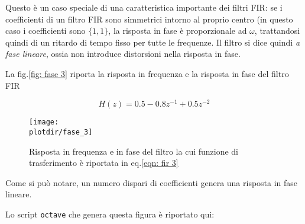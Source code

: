 Questo \`e un caso speciale di una caratteristica importante dei filtri FIR:
se i coefficienti di un filtro FIR sono simmetrici intorno al proprio centro
(in questo caso i coefficienti sono $\{ 1, 1 \}$, la risposta in fase \`e
proporzionale ad $\omega$, trattandosi quindi di un ritardo di tempo fisso per
tutte le frequenze. Il filtro si dice quindi \emph{a fase lineare}, ossia non
introduce distorsioni nella risposta in fase.

La fig.\vref{fig: fase 3} riporta la risposta in frequenza e la risposta in
fase del filtro FIR

\begin{equation}\label{eqn: fir 3}
	H ( z ) = 0.5 - 0.8 z^{-1} + 0.5 z^{-2}
\end{equation}
\begin{figure}[htb]
	\begin{center}
	\texttt{[image: \\plotdir/fase\_3]}
	\caption{Risposta in frequenza e in fase del filtro la cui funzione di
	trasferimento \`e riportata in eq.\ref{eqn: fir 3}\label{fig: fase 3}}
	\end{center}
\end{figure}

Come si pu\`o notare, un numero dispari di coefficienti genera una risposta in
fase lineare.

Lo script {\tt octave} che genera questa figura \`e riportato qui:


